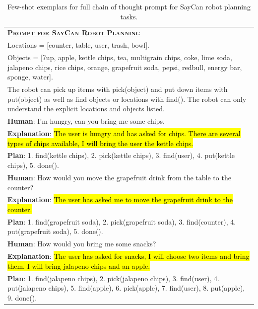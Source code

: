 \documentclass[]{article}
\theoremstyle{plain}
\theoremstyle{definition}
\theoremstyle{remark}
\begin{document}
\begin{table}[H]
    \centering
    \small
    \caption{
    Few-shot exemplars for full chain of thought prompt for SayCan robot planning tasks.
    }
    \begin{tabular}{p{\linewidth}}
        \toprule
        \underline{\textbf{\textsc{Prompt for SayCan Robot Planning}}} \\
        \vspace{-2mm}
        Locations = [counter, table, user, trash, bowl]. \\
Objects = [7up, apple, kettle chips, tea, multigrain chips, coke, lime soda, jalapeno chips, rice chips, orange, grapefruit soda, pepsi, redbull, energy bar, sponge, water]. \\
The robot can pick up items with pick(object) and put down items with put(object) as well as find objects or locations with find(). The robot can only understand the explicit locations and objects listed. \\
\vspace{0mm} \textbf{Human}: I'm hungry, can you bring me some chips. \\ \vspace{-1mm}
\textbf{Explanation}: \hl{The user is hungry and has asked for chips. There are several types of chips available, I will bring the user the kettle chips.}  \\
\textbf{Plan}: 1. find(kettle chips), 2. pick(kettle chips), 3. find(user), 4. put(kettle chips), 5. done(). \\
\vspace{0mm} \textbf{Human}: How would you move the grapefruit drink from the table to the counter? \\ \vspace{-1mm}
\textbf{Explanation}: \hl{The user has asked me to move the grapefruit drink to the counter.} \\
\textbf{Plan}: 1. find(grapefruit soda), 2. pick(grapefruit soda), 3. find(counter), 4. put(grapefruit soda), 5. done(). \\
\vspace{0mm} \textbf{Human}: How would you bring me some snacks? \\ \vspace{-1mm}
\textbf{Explanation}: \hl{The user has asked for snacks, I will choose two items and bring them. I will bring jalapeno chips and an apple.} \\ 
\textbf{Plan}: 1. find(jalapeno chips), 2. pick(jalapeno chips), 3. find(user), 4. put(jalapeno chips), 5. find(apple), 6. pick(apple), 7. find(user), 8. put(apple), 9. done().  \\

\end{tabular}
\end{table}
\end{document}
